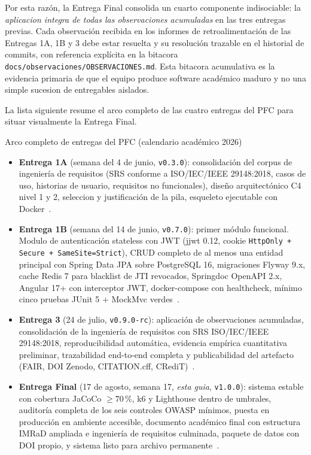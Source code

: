 \documentclass[11pt,a4paper]{article}
\begin{document}
Por esta raz\'{o}n, la Entrega Final consolida un cuarto componente indisociable: la \emph{aplicacion integra de todas las observaciones acumuladas} en las tres entregas previas. Cada observaci\'{o}n recibida en los informes de retroalimentaci\'{o}n de las Entregas 1A, 1B y 3 debe estar resuelta y su resoluci\'{o}n trazable en el historial de commits, con referencia expl\'{i}cita en la bitacora \texttt{docs/observaciones/OBSERVACIONES.md}. Esta bitacora acumulativa es la evidencia primaria de que el equipo produce software acad\'{e}mico maduro y no una simple sucesion de entregables aislados.

La lista siguiente resume el arco completo de las cuatro entregas del PFC para situar visualmente la Entrega Final.

\begin{cajadefinicion}{Arco completo de entregas del PFC (calendario acad\'{e}mico 2026)}
    \begin{itemize}
        \item \textbf{Entrega 1A} (semana del 4 de junio, \texttt{v0.3.0}): consolidaci\'{o}n del corpus de ingenier\'{i}a de requisitos (SRS conforme a ISO/IEC/IEEE 29148:2018, casos de uso, historias de usuario, requisitos no funcionales), dise\~{n}o arquitect\'{o}nico C4 nivel 1 y 2, seleccion y justificaci\'{o}n de la pila, esqueleto ejecutable con Docker~\cite{iso29148,cockburn2001writing,cohn2004user,brown2023c4}.
        \item \textbf{Entrega 1B} (semana del 14 de junio, \texttt{v0.7.0}): primer m\'{o}dulo funcional. Modulo de autenticaci\'{o}n stateless con JWT (jjwt 0.12, cookie \texttt{HttpOnly + Secure + SameSite=Strict}), CRUD completo de al menos una entidad principal con Spring Data JPA sobre PostgreSQL 16, migraciones Flyway 9.x, cache Redis 7 para blacklist de JTI revocados, Springdoc OpenAPI 2.x, Angular 17+ con interceptor JWT, docker-compose con healthcheck, m\'{i}nimo cinco pruebas JUnit 5 + MockMvc verdes~\cite{jones2015jwt,rfc7807,walls2022spring,owasp2021top10}.
        \item \textbf{Entrega 3} (24 de julio, \texttt{v0.9.0-rc}): aplicaci\'{o}n de observaciones acumuladas, consolidaci\'{o}n de la ingenier\'{i}a de requisitos con SRS ISO/IEC/IEEE 29148:2018, reproducibilidad autom\'{a}tica, evidencia emp\'{i}rica cuantitativa preliminar, trazabilidad end-to-end completa y publicabilidad del artefacto (FAIR, DOI Zenodo, CITATION.cff, CRediT)~\cite{iso29148,wilkinson2016fair,acm2020artifact}.
        \item \textbf{Entrega Final} (17 de agosto, semana 17, \emph{esta guia}, \texttt{v1.0.0}): sistema estable con cobertura JaCoCo $\geq 70$\,\%, k6 y Lighthouse dentro de umbrales, auditor\'{i}a completa de los seis controles OWASP m\'{i}nimos, puesta en producci\'{o}n en ambiente accesible, documento acad\'{e}mico final con estructura IMRaD ampliada e ingenier\'{i}a de requisitos culminada, paquete de datos con DOI propio, y sistema listo para archivo permanente~\cite{owasp2021top10,ortega2022securecoding,ralph2021empirical}.
    \end{itemize}
\end{cajadefinicion}
\end{document}
